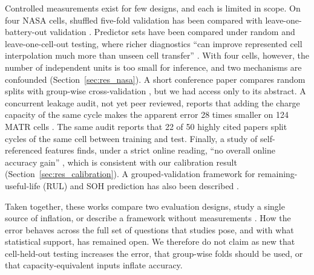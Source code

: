 \documentclass{ieeeaccess}
\begin{document}
Controlled measurements exist for few designs, and each is limited in scope. On four NASA cells, shuffled five-fold validation has been compared with leave-one-battery-out validation \cite{le2026}. Predictor sets have been compared under random and leave-one-cell-out testing, where richer diagnostics ``can improve represented cell interpolation much more than unseen cell transfer'' \cite{barua2026}. With four cells, however, the number of independent units is too small for inference, and two mechanisms are confounded (Section~\ref{sec:res_nasa}). A short conference paper compares random splits with group-wise cross-validation \cite{maher2025}, but we had access only to its abstract. A concurrent leakage audit, not yet peer reviewed, reports that adding the charge capacity of the same cycle makes the apparent error 28 times smaller on 124 MATR cells \cite{erdogan2026}. The same audit reports that 22 of 50 highly cited papers split cycles of the same cell between training and test. Finally, a study of self-referenced features finds, under a strict online reading, ``no overall online accuracy gain'' \cite{peng2026}, which is consistent with our calibration result (Section~\ref{sec:res_calibration}). A grouped-validation framework for remaining-useful-life (RUL) and SOH prediction has also been described \cite{benabdennour2026}.

Taken together, these works compare two evaluation designs, study a single source of inflation, or describe a framework without measurements \cite{le2026,barua2026,maher2025,erdogan2026,ma2026,benabdennour2026}. How the error behaves across the full set of questions that studies pose, and with what statistical support, has remained open. We therefore do not claim as new that cell-held-out testing increases the error, that group-wise folds should be used, or that capacity-equivalent inputs inflate accuracy.
\end{document}
